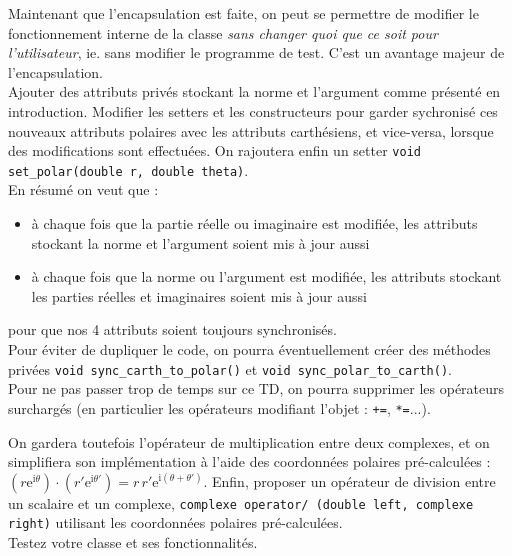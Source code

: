 \documentclass{book}
\newcommand{\inline}[1]{\texttt{#1}}
\begin{document}
Maintenant que l'encapsulation est faite, on peut se permettre de modifier le fonctionnement interne de la classe \emph{sans changer quoi que ce soit pour l'utilisateur}, ie. sans modifier le programme de test. C'est un avantage majeur de l'encapsulation.\\

Ajouter des attributs privés stockant la norme et l'argument comme présenté en introduction. Modifier les setters et les constructeurs pour garder sychronisé ces nouveaux attributs polaires avec les attributs carthésiens, et vice-versa, lorsque des modifications sont effectuées. On rajoutera enfin un setter \inline{void set_polar(double r, double theta)}.\\

En résumé on veut que :
\begin{itemize}
  \item à chaque fois que la partie réelle ou imaginaire est modifiée, les attributs stockant la norme et l'argument soient mis à jour aussi
  \item à chaque fois que la norme ou l'argument est modifiée, les attributs stockant les parties réelles et imaginaires soient mis à jour aussi
\end{itemize}
pour que nos 4 attributs soient toujours synchronisés.\\

Pour éviter de dupliquer le code, on pourra éventuellement créer des méthodes privées \inline{void sync_carth_to_polar()} et \inline{void sync_polar_to_carth()}.\\

Pour ne pas passer trop de temps sur ce TD, on pourra supprimer les opérateurs surchargés (en particulier les opérateurs modifiant l'objet : \inline{+=}, \inline{*=}...).

On gardera toutefois l'opérateur de multiplication entre deux complexes, et on simplifiera son implémentation à l'aide des coordonnées polaires pré-calculées : $(r\mathrm{e}^{\mathrm{i}\theta})\cdot(r'\mathrm{e}^{\mathrm{i}\theta'})=r\,r'\mathrm{e}^{\mathrm{i}(\theta+\theta')}$.
Enfin, proposer un opérateur de division entre un scalaire et un complexe, \inline{complexe operator/ (double left, complexe right)} utilisant les coordonnées polaires pré-calculées.\\

Testez votre classe et ses fonctionnalités.
\end{document}
